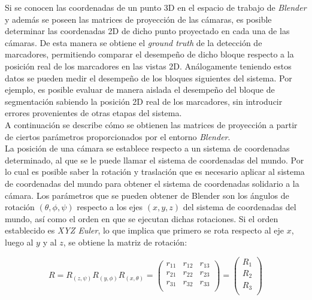 Si se conocen las coordenadas de un punto 3D en el espacio de trabajo de \emph{Blender} y además se poseen las matrices de proyección de las cámaras, es posible determinar las coordenadas 2D de dicho punto proyectado en cada una de las cámaras. De esta manera se obtiene  el \textit{ground truth} de la detección de marcadores, permitiendo comparar el desempeño de dicho bloque respecto  a la posición real de los marcadores en las vistas 2D. Análogamente teniendo estos datos se pueden medir el desempeño de los bloques siguientes del sistema. Por ejemplo, es posible evaluar de manera aislada el desempeño del bloque de segmentación sabiendo la posición 2D real de los marcadores, sin introducir errores provenientes de otras etapas del sistema.\\

A continuación se describe cómo se obtienen las matrices de proyección a partir de ciertos parámetros proporcionados por el entorno \emph{Blender}.\\

La posición de una cámara se establece respecto a un sistema de coordenadas determinado, al que se le puede llamar el sistema de coordenadas del mundo. Por lo cual es posible saber la rotación y traslación que es necesario aplicar al sistema de coordenadas del mundo para obtener el sistema de coordenadas solidario a la cámara. Los parámetros que se pueden obtener de Blender son los ángulos de rotación $(\theta, \phi, \psi )$ respecto a los ejes $(x,y, z)$ del sistema de coordenadas del mundo, así como el orden en que se ejecutan dichas rotaciones. Si el orden establecido es \textit{XYZ Euler}, lo que implica que primero se rota respecto al eje $x$, luego al $y$ y al $z$, se obtiene la matriz de rotación:

\[R=R_{(z,\psi)}R_{(y,\phi)}R_{(x,\theta)}
= \begin{pmatrix}
		r_{11} & r_{12} & r_{13}\\
		r_{21} & r_{22} & r_{23}\\
		r_{31} & r_{32} & r_{33}\\ 
\end{pmatrix}= 
\begin{pmatrix}
			R_1 \\
			R_2 \\
			R_3 \\
		\end{pmatrix}
\]
 
